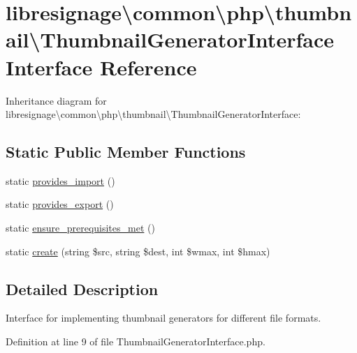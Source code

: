 \hypertarget{interfacelibresignage_1_1common_1_1php_1_1thumbnail_1_1ThumbnailGeneratorInterface}{}\section{libresignage\textbackslash{}common\textbackslash{}php\textbackslash{}thumbnail\textbackslash{}Thumbnail\+Generator\+Interface Interface Reference}
\label{interfacelibresignage_1_1common_1_1php_1_1thumbnail_1_1ThumbnailGeneratorInterface}


Inheritance diagram for libresignage\textbackslash{}common\textbackslash{}php\textbackslash{}thumbnail\textbackslash{}Thumbnail\+Generator\+Interface\+:
\subsection*{Static Public Member Functions}
\begin{DoxyCompactItemize}
\item 
static \hyperlink{interfacelibresignage_1_1common_1_1php_1_1thumbnail_1_1ThumbnailGeneratorInterface_a2fe5cbf9b09b7ef8416cfa86999aaab8}{provides\+\_\+import} ()
\item 
static \hyperlink{interfacelibresignage_1_1common_1_1php_1_1thumbnail_1_1ThumbnailGeneratorInterface_a8740f912c85094c22b397f7df0142cde}{provides\+\_\+export} ()
\item 
static \hyperlink{interfacelibresignage_1_1common_1_1php_1_1thumbnail_1_1ThumbnailGeneratorInterface_ada1412d696863bb01ad24dd47a3eba41}{ensure\+\_\+prerequisites\+\_\+met} ()
\item 
static \hyperlink{interfacelibresignage_1_1common_1_1php_1_1thumbnail_1_1ThumbnailGeneratorInterface_ac4301d4bc3ac1011243a81a9ad8c68d5}{create} (string \$src, string \$dest, int \$wmax, int \$hmax)
\end{DoxyCompactItemize}


\subsection{Detailed Description}
Interface for implementing thumbnail generators for different file formats. 

Definition at line 9 of file Thumbnail\+Generator\+Interface.\+php.



